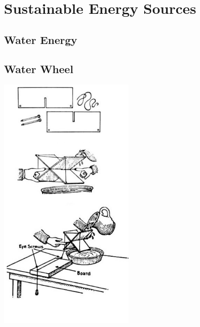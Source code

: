 \section{Sustainable Energy Sources}

\begin{multicols}{2}


\section*{Water Energy}


\subsection{Water Wheel}

\begin{center}
\includegraphics[width=0.5\textwidth]{./img/water-wheel.jpg}
\end{center}


\end{multicols}
